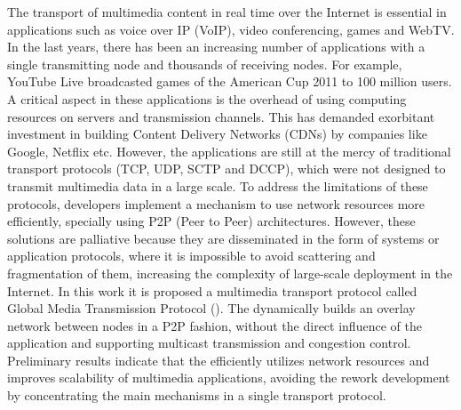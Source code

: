 The transport of multimedia content in real time over the Internet is essential
in applications such as voice over IP (VoIP), video conferencing, games and
WebTV. In the last years, there has been an increasing number of applications
with a single transmitting node and thousands of receiving nodes. For example,
YouTube Live broadcasted games of the American Cup 2011 to 100 million users. A
critical aspect in these applications is the overhead of using computing
resources on servers and transmission channels. This has demanded exorbitant
investment in building Content Delivery Networks (CDNs) by companies like
Google, Netflix etc. However, the applications are still at the mercy of
traditional transport protocols (TCP, UDP, SCTP and DCCP), which were not
designed to transmit multimedia data in a large scale. To address the
limitations of these protocols, developers implement a mechanism to
use network resources more efficiently, specially using P2P (Peer to
Peer) architectures. However, these solutions are palliative because they are
disseminated in the form of systems or application protocols, where it is
impossible to avoid scattering and fragmentation of them, increasing the
complexity of large-scale deployment in the Internet. In this work it is
proposed a multimedia transport protocol called Global Media Transmission
Protocol (\mudccp). The \mudccps dynamically builds an overlay network between
nodes in a P2P fashion, without the direct influence of the application and
supporting multicast transmission and congestion control. Preliminary results
indicate that the \mudccps efficiently utilizes network resources and improves
scalability of multimedia applications, avoiding the rework development by
concentrating the main mechanisms in a single transport protocol.